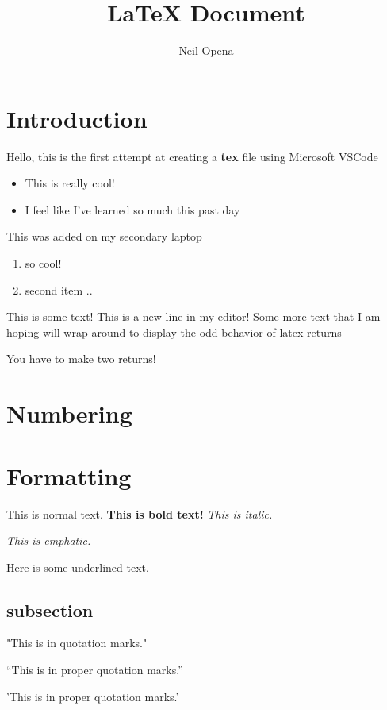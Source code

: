 \documentclass[10pt]{article}
\author{Neil Opena}
\title{{\LaTeX} Document}
\begin{document}
    \maketitle

    \section{Introduction}

    Hello, this is the first attempt at creating a \textbf{tex} file using Microsoft VSCode
    \begin{itemize}
        \item This is really cool!
        \item I feel like I've learned so much this past day
    \end{itemize}
    This was added on my secondary laptop
    \begin{enumerate}
        \item so cool!
        \item second item ..
    \end{enumerate}

    This is some text!
    This is a new line in my editor!
    Some more text that I am hoping will wrap around to display the odd behavior of latex returns

    You have to make two returns!

    \section{Numbering}

    \section{Formatting}

    This is normal text.
    \textbf{This is bold text!}
    \textit{This is italic.}

    \emph{This is emphatic.}

    \underline{Here is some underlined text.}

    \subsection{subsection}

    "This is in quotation marks."

    ``This is in proper quotation marks.''

    'This is in proper quotation marks.'
\end{document}
